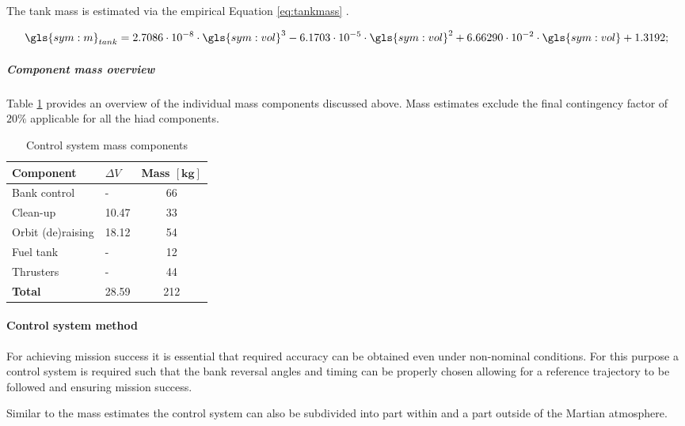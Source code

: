 The tank mass is estimated via the empirical Equation \ref{eq:tankmass} \cite[p.543]{Wertz2011}.

\begin{equation}
\label{eq:tankmass} 
\gls{sym:m}_{tank}=2.7086 \cdot 10^{-8} \cdot \gls{sym:vol}^3 -6.1703 \cdot 10^{-5} \cdot \gls{sym:vol}^2 +6.66290 \cdot 10^{-2}  \cdot \gls{sym:vol} +1.3192;
\end{equation}

\subparagraph{Component mass overview}

Table \ref{tab:controlmassbreakdown} provides an overview of the individual mass components discussed above. Mass estimates exclude the final contingency factor of $20\%$ applicable for all the \gls{hiad} components.

\begin{table}[h]
\centering
\caption{Control system mass components}
\label{tab:controlmassbreakdown}
\begin{tabular}{|l|l|c|} \hline
\textbf{Component}           &\textbf{$\Delta V$}  & \textbf{Mass $\mathbf{[kg]}$} \\ \hline \hline
Bank control    &  - &			 66       \\ \hline
Clean-up         & 10.47  &		  33       \\ \hline
Orbit (de)raising& 18.12  &		  54       \\ \hline
Fuel tank              		 & -  &  12      \\ \hline
Thrusters                	 & -  &  44     \\ \hline \hline
\textbf{Total}               & 28.59  &  212      \\ \hline
\end{tabular}
\end{table}

\paragraph{Control system method}

For achieving mission success it is essential that required accuracy can be obtained even under non-nominal conditions. For this purpose a control system is required such that the bank reversal angles and timing can be properly chosen allowing for a reference trajectory to be followed and ensuring mission success.

Similar to the mass estimates the control system can  also be subdivided into part within and a part outside of the Martian atmosphere.

